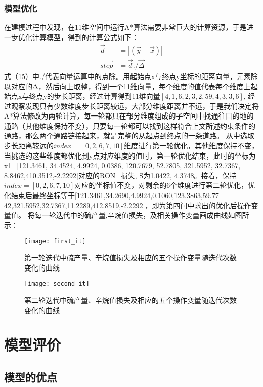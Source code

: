 \documentclass[bwprint]{gmcmthesis}
\begin{document}
\subsubsection{模型优化}
在建模过程中发现，在11维空间中运行A*算法需要非常巨大的计算资源，于是进一步优化计算模型，得到的计算公式如下：
\begin{align}
\vec{d }&=\left | \left ( \vec{y}-\vec{x} \right ) \right |\\
\overrightarrow{step }&= \vec{d }./{\overrightarrow{\Delta} }
\end{align}
式（15）中./代表向量运算中的点除。用起始点x与终点y坐标的距离向量，元素除以对应的Δ，然后向上取整，得到一个11维向量，每个维度的值代表每个维度上起始点x与终点y的步长距离，经过计算得到11维向量\:$[4, 1, 6, 2, 3, 2, 59, 4, 3, 3, 6]$,
经过观察发现只有少数维度步长距离较远，大部分维度距离并不远，于是我们决定将A*算法修改为两轮计算，每一轮都只在部分维度组成的子空间中找通往目的地的通路（其他维度保持不变），只要每一轮都可以找到这样符合上文所述约束条件的通路，那么两个通路链接起来，就是完整的从起点到终点的一条道路。
从中选取步长距离较远的$index=[0,2,6,7,10]$维度进行第一轮优化，其他维度保持不变，当挑选的这些维度都优化到y点对应维度的值时，第一轮优化结束，此时的坐标为
x1=[121.3461, 34.4524, 4.9924, 0.0386, 120.7679, 52.7805, 321.5952, 32.7367, 8.8462,410.3512,-2.2292]对应的RON\_损失,  S为1.0422, 4.3748。接着，保持$index=[0,2,6,7,10]$对应的坐标值不变，对剩余的6个维度进行第二轮优化，优化结束后最终坐标等于[121.3461,34.2690,4.9924,0.1060,123.3863,59.77
42,321.5952,32.7367,11.2289,412.8519,-2.2292]，即为第四问中求出的优化后操作变量值。
将每一轮迭代中的硫产量,辛烷值损失，及相关操作变量画成曲线如图所示：
\begin{figure}[htb]
	\centering
	\texttt{[image: first\_it]}
	\caption{第一轮迭代中硫产量、辛烷值损失及相应的五个操作变量随迭代次数变化的曲线}
\end{figure}


\begin{figure}[htb]
	\centering
	\texttt{[image: second\_it]}
	\caption{第二轮迭代中硫产量、辛烷值损失及相应的五个操作变量随迭代次数变化的曲线}
\end{figure}


\FloatBarrier
\section{模型评价}


\FloatBarrier
\subsection{模型的优点}
\FloatBarrier
\end{document}
